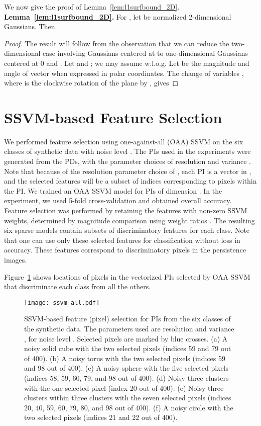 \documentclass[11pt]{article}
\begin{document}
We now give the proof of Lemma~\ref{lem:l1surfbound_2D}.\\

\noindent\textbf{Lemma~\ref{lem:l1surfbound_2D}.}
 For , let  be normalized 2-dimensional Gaussians. Then
 
\begin{proof}
The result will follow from the observation that we can reduce the two-dimensional case involving Gaussians centered at  to one-dimensional Gaussians centered at 0 and . Let  and ; we may assume  w.l.o.g. Let  be the magnitude and angle of vector  when expressed in polar coordinates. The change of variables , where  is the clockwise rotation of the plane by , gives

\end{proof}


\section{SSVM-based Feature Selection} 
\label{app:featureselection}

We performed feature selection using one-against-all (OAA) SSVM on the six classes of synthetic data with noise level . The PIs used in the experiments were generated from the  PDs, with the parameter choices of resolution  and variance . Note that because of the resolution parameter choice of , each PI is a vector in , and the selected features will be a subset of indices corresponding to pixels within the PI.  We trained an OAA SSVM model for PIs of dimension . In the experiment, we used 5-fold cross-validation and obtained  overall accuracy. Feature selection was performed by retaining the features with non-zero SSVM weights, determined by magnitude comparison using weight ratios \citep{chep}.  The resulting six sparse models contain subsets of discriminatory features for each class. Note that one can use only these selected features for classification without loss in accuracy. These features correspond to discriminatory pixels in the persistence images.

Figure~\ref{fig:FeatureSelection2} shows locations of pixels in the vectorized PIs selected by OAA SSVM that discriminate each class from all the others. 

\begin{figure}[H]
\centering
\texttt{[image: ssvm\_all.pdf]}
\caption{SSVM-based feature (pixel) selection for  PIs from the six classes of the synthetic data. The parameters used are resolution  and variance , for noise level . Selected pixels are marked by blue crosses. (a) A noisy solid cube with the two selected pixels (indices 59 and 79 out of 400). (b) A noisy torus with the two selected pixels (indices 59 and 98 out of 400). (c) A noisy sphere with the five selected pixels (indices 58, 59, 60, 79, and 98 out of 400). (d) Noisy three clusters with the one selected pixel (index 20 out of 400). (e) Noisy three clusters within three clusters with the seven selected pixels (indices 20, 40, 59, 60, 79, 80, and 98 out of 400). (f) A noisy circle with the two selected pixels (indices 21 and 22 out of 400). }
\label{fig:FeatureSelection2}
\end{figure}
\end{document}
